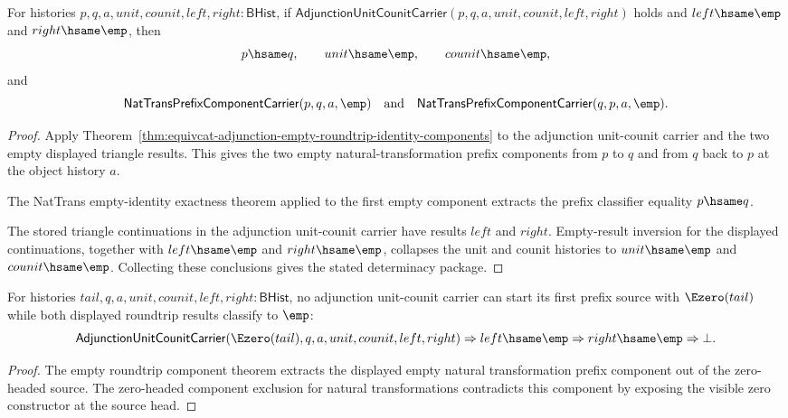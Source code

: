 \begin{theorem}
\label{thm:equivcat-empty-roundtrip-prefix-determinacy}
For histories $p,q,a,unit,counit,left,right:\mathsf{BHist}$, if
$\mathsf{AdjunctionUnitCounitCarrier}(p,q,a,unit,counit,left,right)$ holds
and $left\hsame\emp$ and $right\hsame\emp$, then
$$
p\hsame q,\qquad
unit\hsame\emp,\qquad
counit\hsame\emp,
$$
and
$$
\mathsf{NatTransPrefixComponentCarrier}(p,q,a,\emp)
\quad\text{and}\quad
\mathsf{NatTransPrefixComponentCarrier}(q,p,a,\emp).
$$
\end{theorem}
\begin{proof}
Apply Theorem~\ref{thm:equivcat-adjunction-empty-roundtrip-identity-components}
to the adjunction unit-counit carrier and the two empty displayed triangle
results. This gives the two empty natural-transformation prefix components
from $p$ to $q$ and from $q$ back to $p$ at the object history $a$.

The NatTrans empty-identity exactness theorem applied to the first empty
component extracts the prefix classifier equality $p\hsame q$.

The stored triangle continuations in the adjunction unit-counit carrier have
results $left$ and $right$. Empty-result inversion for the displayed
continuations, together with $left\hsame\emp$ and $right\hsame\emp$, collapses
the unit and counit histories to $unit\hsame\emp$ and $counit\hsame\emp$.
Collecting these conclusions gives the stated determinacy package.
\end{proof}

\begin{theorem}
\label{thm:equivcat-adjunction-empty-roundtrip-zero-source-absurd}
For histories $tail,q,a,unit,counit,left,right:\mathsf{BHist}$, no
adjunction unit-counit carrier can start its first prefix source with
$\Ezero(tail)$ while both displayed roundtrip results classify to $\emp$:
$$
\mathsf{AdjunctionUnitCounitCarrier}
  (\Ezero(tail),q,a,unit,counit,left,right)
\Rightarrow left\hsame\emp
\Rightarrow right\hsame\emp
\Rightarrow \bot.
$$
\end{theorem}
\begin{proof}
The empty roundtrip component theorem extracts the displayed empty natural
transformation prefix component out of the zero-headed source. The
zero-headed component exclusion for natural transformations contradicts this
component by exposing the visible zero constructor at the source head.
\end{proof}

